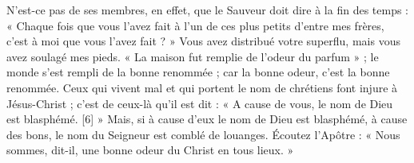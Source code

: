 N’est-ce pas de ses membres, en effet, que le Sauveur doit dire à la fin des temps : « Chaque fois que vous l’avez fait à l’un de ces plus petits d’entre mes frères, c’est à moi que vous l’avez fait ? » Vous avez distribué votre superflu, mais vous avez soulagé mes pieds. « La maison fut remplie de l’odeur du parfum » ; le monde s’est rempli de la bonne renommée ; car la bonne odeur, c’est la bonne renommée. Ceux qui vivent mal et qui portent le nom de chrétiens font injure à Jésus-Christ ; c’est de ceux-là qu’il est dit : « A cause de vous, le nom de Dieu est blasphémé. [6] » Mais, si à cause d’eux le nom de Dieu est blasphémé, à cause des bons, le nom du Seigneur est comblé de louanges. Écoutez l’Apôtre : « Nous sommes, dit-il, une bonne odeur du Christ en tous lieux. »
